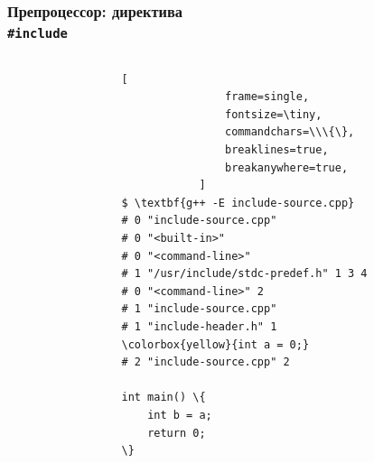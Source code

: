 \documentclass[compress]{beamer}
\begin{document}
\begin{frame}[fragile]

    \frametitle{Препроцессор: директива \\ \texttt{\#include}}

    \begin{columns}[T]

        \begin{column}{0.5\textwidth}



        \end{column}

        \begin{column}{0.5\textwidth}

            \begin{Verbatim}[
                frame=single,
                fontsize=\tiny,
                commandchars=\\\{\},
                breaklines=true,
                breakanywhere=true,
            ]
$ \textbf{g++ -E include-source.cpp}
# 0 "include-source.cpp"
# 0 "<built-in>"
# 0 "<command-line>"
# 1 "/usr/include/stdc-predef.h" 1 3 4
# 0 "<command-line>" 2
# 1 "include-source.cpp"
# 1 "include-header.h" 1
\colorbox{yellow}{int a = 0;}
# 2 "include-source.cpp" 2

int main() \{
    int b = a;
    return 0;
\}
            \end{Verbatim}

        \end{column}

    \end{columns}

\end{frame}
\end{document}
